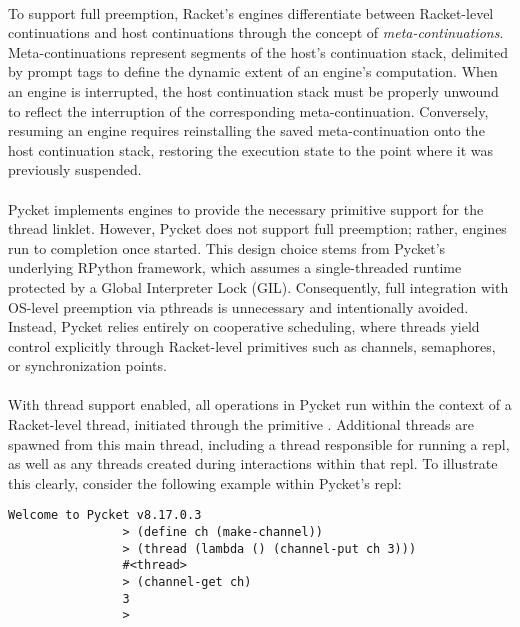 				\paragraph{}%
					To support full preemption, Racket's engines differentiate between Racket-level continuations and host continuations through the concept of \emph{meta-continuations}. Meta-continuations represent segments of the host's continuation stack, delimited by prompt tags to define the dynamic extent of an engine's computation. When an engine is interrupted, the host continuation stack must be properly unwound to reflect the interruption of the corresponding meta-continuation. Conversely, resuming an engine requires reinstalling the saved meta-continuation onto the host continuation stack, restoring the execution state to the point where it was previously suspended.

				\paragraph{}%
					Pycket implements engines to provide the necessary primitive support for the thread linklet. However, Pycket does not support full preemption; rather, engines run to completion once started. This design choice stems from Pycket's underlying RPython framework, which assumes a single-threaded runtime protected by a Global Interpreter Lock (GIL). Consequently, full integration with OS-level preemption via pthreads is unnecessary and intentionally avoided. Instead, Pycket relies entirely on cooperative scheduling, where threads yield control explicitly through Racket-level primitives such as channels, semaphores, or synchronization points.

				\paragraph{}%
					With thread support enabled, all operations in Pycket run within the context of a Racket-level thread, initiated through the primitive . Additional threads are spawned from this main thread, including a thread responsible for running a \gls{repl}, as well as any threads created during interactions within that \gls{repl}. To illustrate this clearly, consider the following example within Pycket's \gls{repl}:

				\begin{center}
					\begin{minipage}{0.75\textwidth}
						\begin{lstlisting}[style=bashstyle,frame=lines,numbers=none,basicstyle=\small\ttfamily\linespread{0.85}\selectfont]
				Welcome to Pycket v8.17.0.3
				> (define ch (make-channel))
				> (thread (lambda () (channel-put ch 3)))
				#<thread>
				> (channel-get ch)
				3
				>\end{lstlisting}
					\end{minipage}
				\end{center}

